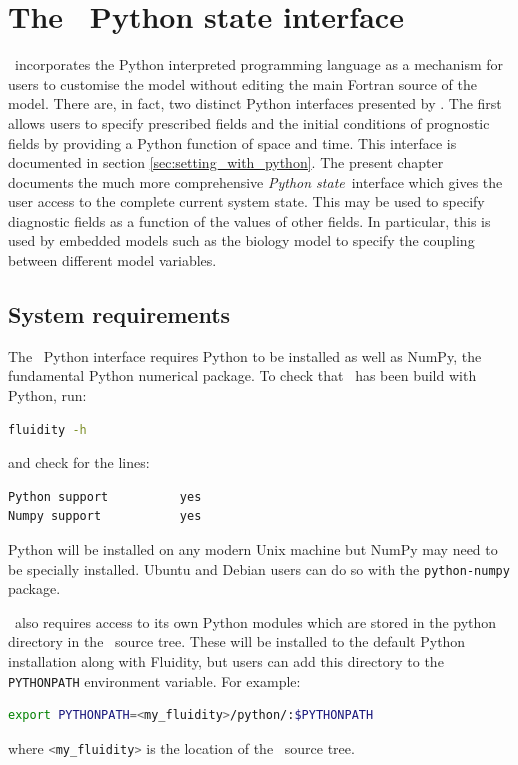 \chapter{The \fluidity\ Python state interface}\label{chap:python}

\fluidity\ incorporates the Python interpreted programming language as a
mechanism for users to customise the model without editing the main Fortran
source of the model. There are, in fact, two distinct Python interfaces
presented by \fluidity. The first allows users to specify prescribed fields
and the initial conditions of prognostic fields by providing a Python
function of space and time. This interface is documented in section
\ref{sec:setting_with_python}. The present chapter documents the much more
comprehensive \emph{Python state}\ interface which gives the user access to
the complete current system state. This may be used to specify diagnostic
fields as a function of the values of other fields. In particular, this is
used by embedded models such as the biology model to specify the coupling
between different model variables.

\section{System requirements}

The \fluidity\ Python interface requires Python to be installed as well as
NumPy, the fundamental Python numerical package. To check that \fluidity\
has been build with Python, run:
\begin{lstlisting}[language=Bash]
  fluidity -h
\end{lstlisting}
and check for the lines:
\begin{lstlisting}[language=Bash]
Python support			yes
Numpy support			yes
\end{lstlisting}
Python will be installed on any modern Unix machine but NumPy may need to be
specially installed. Ubuntu and Debian users can do so with the
\lstinline[language=Bash]+python-numpy+ package.

\fluidity\ also requires access to its own Python modules which are stored in
the python directory in the \fluidity\ source tree. These will be installed
to the default Python installation along with Fluidity, but users can add this
directory to the \lstinline[language=Bash]+PYTHONPATH+ environment variable.
For example:\
\begin{lstlisting}[language=Bash]
export PYTHONPATH=<my_fluidity>/python/:$PYTHONPATH
\end{lstlisting}%
where \lstinline[language=Bash]+<my_fluidity>+ is the location of the
\fluidity\ source tree.

